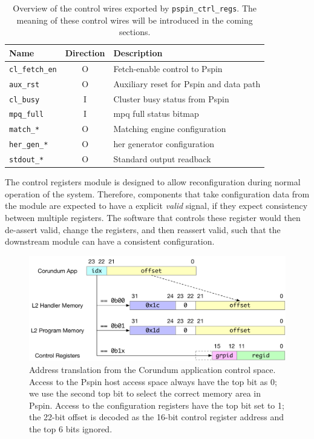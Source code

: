 \begin{table}[ht]
    \centering
    \begin{tabular}{lcl}
    \toprule
    Name & Direction & Description \\ \midrule
    \texttt{cl\_fetch\_en} & O & Fetch-enable control to P\acs{spin} \\
    \texttt{aux\_rst} & O & Auxiliary reset for P\acs{spin} and data path \\
    \texttt{cl\_busy} & I & Cluster busy status from P\acs{spin} \\
    \texttt{mpq\_full} & I & \ac{mpq} full status bitmap \\
    \texttt{match\_*} & O & Matching engine configuration \\
    \texttt{her\_gen\_*} & O & \ac{her} generator configuration \\
    \texttt{stdout\_*} & O & Standard output readback \\
    \bottomrule
    \end{tabular}
    \caption{Overview of the control wires exported by \texttt{pspin\_ctrl\_regs}.  The meaning of these control wires will be introduced in the coming sections.}
    \label{tab:ctrl-signals}
\end{table}

The control registers module is designed to allow reconfiguration during normal operation of the system.  Therefore, components that take configuration data from the module are expected to have a explicit \emph{valid} signal, if they expect consistency between multiple registers.  The software that controls these register would then de-assert valid, change the registers, and then reassert valid, such that the downstream module can have a consistent configuration.

\begin{figure}
    \centering
    \includegraphics[width=.8\textwidth]{thesis/figures/corundum-pspin-addr.pdf}
    \caption{Address translation from the Corundum application control space.  Access to the P\acs{spin} host access space always have the top bit as 0; we use the second top bit to select the correct memory area in P\acs{spin}.  Access to the configuration registers have the top bit set to 1; the 22-bit offset is decoded as the 16-bit control register address and the top 6 bits ignored.} \label{fig:hw-addr-map}
\end{figure}

